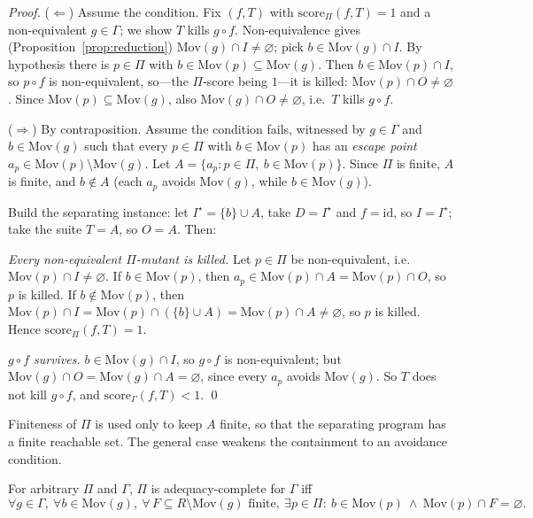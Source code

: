 \documentclass[runningheads,envcountsect,envcountsame]{llncs}
\newcommand{\Mov}{\mathrm{Mov}}
\newcommand{\score}{\mathrm{score}}
\begin{document}
\begin{proof}
($\Leftarrow$) Assume the condition. Fix $(f,T)$ with $\score_\Pi(f,T) = 1$ and a
non-equivalent $g \in \Gamma$; we show $T$ kills $g \circ f$. Non-equivalence
gives (Proposition~\ref{prop:reduction}) $\Mov(g) \cap I \neq \varnothing$; pick
$b \in \Mov(g) \cap I$. By hypothesis there is $p \in \Pi$ with
$b \in \Mov(p) \subseteq \Mov(g)$. Then $b \in \Mov(p) \cap I$, so $p \circ f$ is
non-equivalent, so---the $\Pi$-score being $1$---it is killed:
$\Mov(p) \cap O \neq \varnothing$. Since $\Mov(p) \subseteq \Mov(g)$, also
$\Mov(g) \cap O \neq \varnothing$, i.e.\ $T$ kills $g \circ f$.

($\Rightarrow$) By contraposition. Assume the condition fails, witnessed by
$g \in \Gamma$ and $b \in \Mov(g)$ such that every $p \in \Pi$ with
$b \in \Mov(p)$ has an \emph{escape point} $a_p \in \Mov(p) \setminus \Mov(g)$.
Let $A = \{a_p : p \in \Pi,\ b \in \Mov(p)\}$. Since $\Pi$ is finite, $A$ is
finite, and $b \notin A$ (each $a_p$ avoids $\Mov(g)$, while $b \in \Mov(g)$).

Build the separating instance: let $I^\star = \{b\} \cup A$, take $D = I^\star$
and $f = \mathrm{id}$, so $I = I^\star$; take the suite $T = A$, so $O = A$. Then:

\emph{Every non-equivalent $\Pi$-mutant is killed.} Let $p \in \Pi$ be
non-equivalent, i.e.\ $\Mov(p) \cap I \neq \varnothing$. If $b \in \Mov(p)$, then
$a_p \in \Mov(p) \cap A = \Mov(p) \cap O$, so $p$ is killed. If
$b \notin \Mov(p)$, then
$\Mov(p) \cap I = \Mov(p) \cap (\{b\} \cup A) = \Mov(p) \cap A \neq \varnothing$,
so $p$ is killed. Hence $\score_\Pi(f,T) = 1$.

\emph{$g \circ f$ survives.} $b \in \Mov(g) \cap I$, so $g \circ f$ is
non-equivalent; but $\Mov(g) \cap O = \Mov(g) \cap A = \varnothing$, since every
$a_p$ avoids $\Mov(g)$. So $T$ does not kill $g \circ f$, and
$\score_\Gamma(f,T) < 1$. \qed
\end{proof}

Finiteness of $\Pi$ is used only to keep $A$ finite, so that the separating
program has a finite reachable set. The general case weakens the containment to
an avoidance condition.

\begin{theorem}
\label{thm:chargen}
For arbitrary $\Pi$ and $\Gamma$, $\Pi$ is adequacy-complete for $\Gamma$ iff
\[
  \forall g \in \Gamma,\ \forall b \in \Mov(g),\
  \forall\, F \subseteq R \setminus \Mov(g) \text{ finite},\
  \exists p \in \Pi :\ b \in \Mov(p) \ \wedge\ \Mov(p) \cap F = \varnothing.
\]
\end{theorem}
\end{document}
